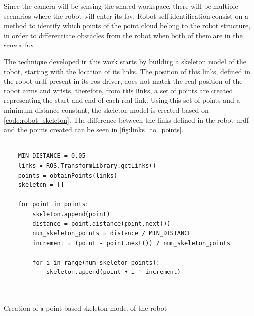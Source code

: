 \par Since the camera will be sensing the shared workspace, there will be multiple scenarios where the robot will enter its \ac{fov}. Robot self identification consist on a method to identify which points of the point cloud belong to the robot structure, in order to differentiate obstacles from the robot when both of them are in the sensor \ac{fov}.
\par The technique developed in this work starts by building a skeleton model of the robot, starting with the location of its links. The position of this links, defined in the robot \ac{urdf} present in its \ac{ros} driver, does not match the real position of the robot arms and wrists, therefore, from this links, a set of points are created representing the start and end of each real link. Using this set of points and a minimum distance constant, the skeleton model is created based on \autoref{code:robot_skeleton}. The difference between the links defined in the robot \ac{urdf} and the points created can be seen in \autoref{fig:links_to_points}.


\begin{listing}[h]
    \centering
    \begin{verbatim}

    MIN_DISTANCE = 0.05
    links = ROS.TransformLibrary.getLinks()
    points = obtainPoints(links)
    skeleton = []

    for point in points:  
        skeleton.append(point)
        distance = point.distance(point.next())
        num_skeleton_points = distance / MIN_DISTANCE
        increment = (point - point.next()) / num_skeleton_points

        for i in range(num_skeleton_points):
            skeleton.append(point + i * increment)

    
    \end{verbatim}
\caption{Creation of a point based skeleton model of the robot}
\label{code:robot_skeleton}
\end{listing}


